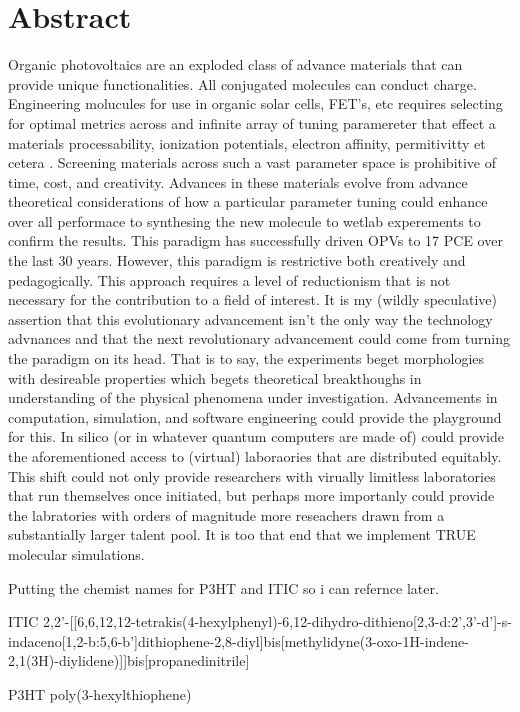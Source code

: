 
\chapter*{Abstract}

Organic photovoltaics are an exploded  class of advance materials that can provide unique functionalities.
All conjugated molecules can conduct charge. 
Engineering molucules for use in organic solar cells, FET's, etc 
requires selecting for optimal metrics across and infinite array of tuning paramereter that effect a materials
processability, ionization potentials, electron affinity, permitivitty et cetera . 
Screening materials across
such a vast parameter space is prohibitive of time, cost, and creativity. Advances in these materials evolve
from advance theoretical considerations of how a particular parameter tuning could enhance over all performace
to synthesing the new molecule to wetlab experements to confirm the results. This paradigm has successfully
driven OPVs to 17 PCE over the last 30 years. However, this paradigm is restrictive both creatively and
pedagogically. This approach requires a level of reductionism that is not necessary for the contribution to a
field of interest. It is my (wildly speculative) assertion that this evolutionary advancement isn't the only
way the technology advnances and that the next revolutionary advancement could come from turning the paradigm
on its head. That is to say, the experiments beget morphologies with desireable properties which begets
theoretical breakthoughs in understanding of the physical phenomena under investigation. Advancements in
computation, simulation, and software engineering could provide the playground for this. In silico (or in
whatever quantum computers are made of) could provide the aforementioned access to (virtual) laboraories that
are distributed equitably. This shift could not only provide researchers with virually limitless 
laboratories that run themselves once initiated, but perhaps more importanly could provide the labratories
with orders of magnitude more reseachers drawn from a substantially larger talent pool. It is too that end
that we implement TRUE molecular simulations.    

Putting the chemist names for P3HT and ITIC so i can refernce later. 

ITIC
2,2'-[[6,6,12,12-tetrakis(4-hexylphenyl)-6,12-dihydro-dithieno[2,3-d:2',3'-d']-s-indaceno[1,2-b:5,6-b']dithiophene-2,8-diyl]bis[methylidyne(3-oxo-1H-indene-2,1(3H)-diylidene)]]bis[propanedinitrile]

P3HT poly(3-hexylthiophene)




